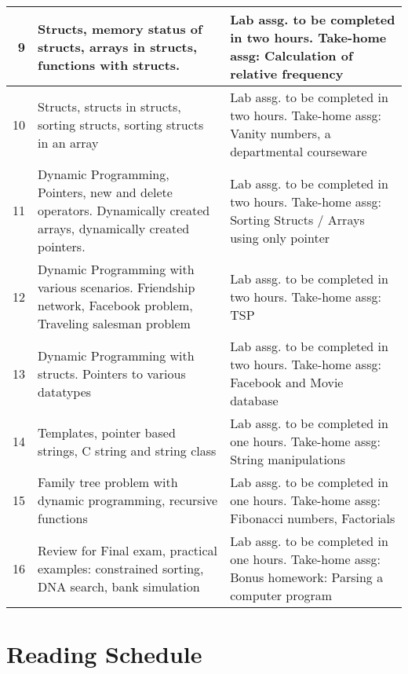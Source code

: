 \documentclass[11pt]{article}
\begin{document}
\begin{center}
\begin{tabular}{rll}
\hline
9 & Structs, memory status of structs, arrays in structs, functions with structs. & Lab assg. to be completed in two hours. Take-home assg: Calculation of relative frequency\\
\hline
10 & Structs, structs in structs, sorting structs, sorting structs in an array & Lab assg. to be completed in two hours. Take-home assg: Vanity numbers, a departmental courseware\\
\hline
11 & Dynamic Programming, Pointers, new and delete operators.  Dynamically created arrays, dynamically created pointers. & Lab assg. to be completed in two hours. Take-home assg: Sorting Structs / Arrays using only pointer\\
\hline
12 & Dynamic Programming with various scenarios.  Friendship network, Facebook problem, Traveling salesman problem & Lab assg. to be completed in two hours. Take-home assg: TSP\\
\hline
13 & Dynamic Programming with structs.  Pointers to various datatypes & Lab assg. to be completed in two hours. Take-home assg: Facebook and Movie database\\
\hline
14 & Templates, pointer based strings, C string and string class & Lab assg. to be completed in one hours. Take-home assg: String manipulations\\
\hline
15 & Family tree problem with dynamic programming, recursive functions & Lab assg. to be completed in one hours. Take-home assg: Fibonacci numbers, Factorials\\
\hline
16 & Review for Final exam, practical examples: constrained sorting, DNA search, bank simulation & Lab assg. to be completed in one hours. Take-home assg: Bonus homework: Parsing a computer program\\
\hline
\end{tabular}
\end{center}
\section*{Reading Schedule}
\label{sec-12}
\end{document}
